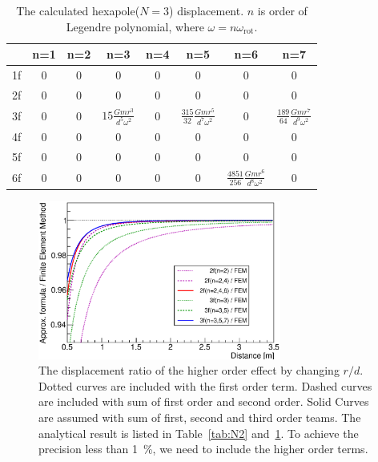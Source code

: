 \documentclass[%
 reprint,
superscriptaddress,
 amsmath,amssymb,
 aps,
]{revtex4-1}
\begin{document}
\begin{table}
\begin{center}
\caption{The calculated hexapole($N=3$) displacement. $n$ is order of Legendre polynomial, where $\omega=n\omega_{\mathrm{rot}}$.  \label{tab:N3}}
\footnotesize
\begin{tabular}{cccccccc}
\hline
& n=1 & n=2& n=3 &n=4&n=5&n=6&n=7 \\
\hline
1f&0&0&0&0&0&0&0 \\
2f&0&0&0&0&0&0&0  \\
3f&0&0&$15\frac{Gmr^3}{d^5\omega^2}$&0&$\frac{315}{32}\frac{Gmr^5}{d^7\omega^2}$&0& $\frac{189}{64} \frac{Gmr^7}{d^9 \omega^2}$\\
4f&0&0&0&0&0&0&0 \\
5f&0&0&0&0&0&0&0 \\
6f&0&0&0&0&0&$\frac{4851}{256} \frac{Gmr^6}{d^8\omega^2}$&0  \\
\hline
\end{tabular}
\end{center}
\end{table}

\begin{figure}
\begin{center}
\includegraphics[width=8cm]{dvsx_ratio.eps}
\caption{The displacement ratio of the higher order effect by changing $r/d$. Dotted curves are included with the first order term. Dashed curves are included with sum of first order and second order. Solid Curves are assumed with sum of first, second and third order teams. The analytical result is listed in Table~\ref{tab:N2} and~\ref{tab:N3}. To achieve the precision less than 1~\%, we need to include the higher order terms.}
\label{fig:FEM}
\end{center}
\end{figure}
\end{document}
